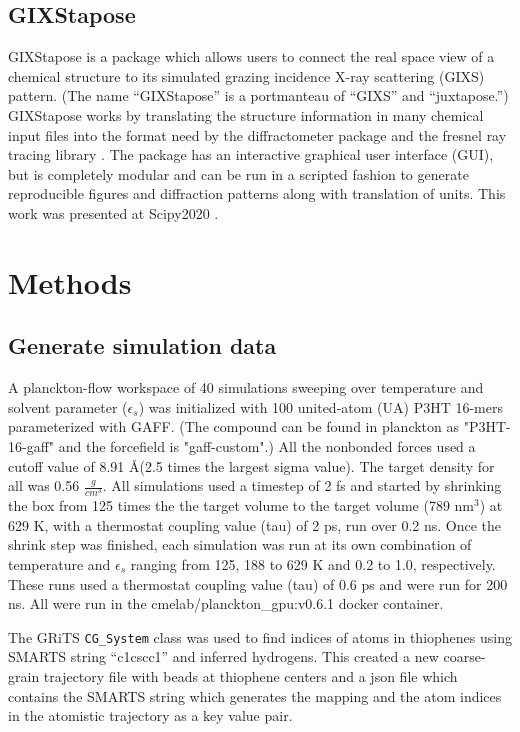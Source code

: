 \subsection{GIXStapose}
GIXStapose is a package which allows users to connect the real space view of a chemical structure to its simulated grazing incidence X-ray scattering (GIXS) pattern. (The name ``GIXStapose'' is a portmanteau of ``GIXS'' and ``juxtapose.'') GIXStapose works by translating the structure information in many chemical input files into the format need by the diffractometer package and the fresnel ray tracing library \cite{Diffract, Jones2017, fresnel}. The package has an interactive graphical user interface (GUI), but is completely modular and can be run in a scripted fashion to generate reproducible figures and diffraction patterns along with translation of units. This work was presented at Scipy2020 \cite{gixstapose-scipy}. 

\section{Methods}
\subsection{Generate simulation data}
A planckton-flow workspace of 40 simulations sweeping over temperature and solvent parameter ($\epsilon_{s}$) was initialized with 100 united-atom (UA) P3HT 16-mers parameterized with GAFF. (The compound can be found in planckton as "P3HT-16-gaff" and the forcefield is "gaff-custom".) All the nonbonded forces used a cutoff value of 8.91 \AA (2.5 times the largest sigma value). The target density for all was 0.56 $\frac{g}{cm^{3}}$. All simulations used a timestep of 2 fs and started by shrinking the box from 125 times the the target volume to the target volume (789 nm$^3$) at 629 K, with a thermostat coupling value (tau) of 2 ps, run over 0.2 ns. Once the shrink step was finished, each simulation was run at its own combination of temperature and $\epsilon_{s}$ ranging from 125, 188 to 629 K and 0.2 to 1.0, respectively. These runs used a thermostat coupling value (tau) of 0.6 ps and were run for 200 ns. All were run in the cmelab/planckton\_gpu:v0.6.1 docker container. 


The GRiTS \lstinline{CG_System} class was used to find indices of atoms in thiophenes using SMARTS string ``c1cscc1'' and inferred hydrogens. This created a new coarse-grain trajectory file with beads at thiophene centers and a json file which contains the SMARTS string which generates the mapping and the atom indices in the atomistic trajectory as a key value pair.


